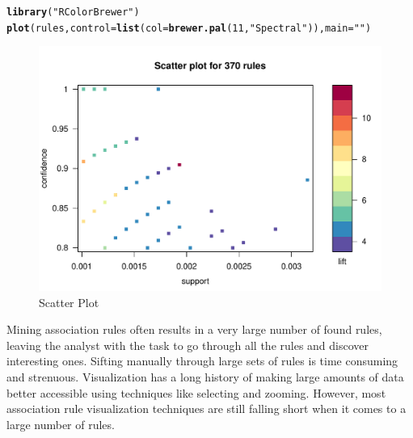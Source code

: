 \documentclass{article}\usepackage[]{graphicx}\usepackage[]{color}
\makeatletter
\def\maxwidth{ %
  \ifdim\Gin@nat@width>\linewidth
    \linewidth
  \else
    \Gin@nat@width
  \fi
}
\newcommand{\hlnum}[1]{\textcolor[rgb]{0.686,0.059,0.569}{#1}}%
\newcommand{\hlstr}[1]{\textcolor[rgb]{0.192,0.494,0.8}{#1}}%
\newcommand{\hlstd}[1]{\textcolor[rgb]{0.345,0.345,0.345}{#1}}%
\newcommand{\hlkwc}[1]{\textcolor[rgb]{0.333,0.667,0.333}{#1}}%
\newcommand{\hlkwd}[1]{\textcolor[rgb]{0.737,0.353,0.396}{\textbf{#1}}}%
\newenvironment{kframe}{%
 \def\at@end@of@kframe{}%
 \ifinner\ifhmode%
  \def\at@end@of@kframe{\end{minipage}}%
  \begin{minipage}{\columnwidth}%
 \fi\fi%
 \def\FrameCommand##1{\hskip\@totalleftmargin \hskip-\fboxsep
 \colorbox{shadecolor}{##1}\hskip-\fboxsep
     \hskip-\linewidth \hskip-\@totalleftmargin \hskip\columnwidth}%
 \MakeFramed {\advance\hsize-\width
   \@totalleftmargin\z@ \linewidth\hsize
   \@setminipage}}%
 {\par\unskip\endMakeFramed%
 \at@end@of@kframe}
\newenvironment{knitrout}{}{} %
\makeatother
\begin{document}
\begin{knitrout}
\color{fgcolor}\begin{kframe}
\begin{alltt}
\hlkwd{library}\hlstd{(}\hlstr{"RColorBrewer"}\hlstd{)}
\hlkwd{plot}\hlstd{(rules,}\hlkwc{control}\hlstd{=}\hlkwd{list}\hlstd{(}\hlkwc{col}\hlstd{=}\hlkwd{brewer.pal}\hlstd{(}\hlnum{11}\hlstd{,}\hlstr{"Spectral"}\hlstd{)),}\hlkwc{main}\hlstd{=}\hlstr{""}\hlstd{)}
\end{alltt}
\end{kframe}\begin{figure}
\includegraphics[width=\maxwidth]{figure/unnamed-chunk-12-1} \caption[Scatter Plot]{Scatter Plot}\label{fig:unnamed-chunk-12}
\end{figure}


\end{knitrout}
Mining association rules often results in a very large number of found rules, leaving the analyst with the
task to go through all the rules and discover interesting ones. Sifting manually through large sets of rules is time consuming and strenuous. Visualization has a long history of making large amounts of data better accessible using techniques like selecting and zooming.  However, most association rule visualization techniques are still falling short when it comes to a large number of rules\cite{[6]}.\\
\end{document}

